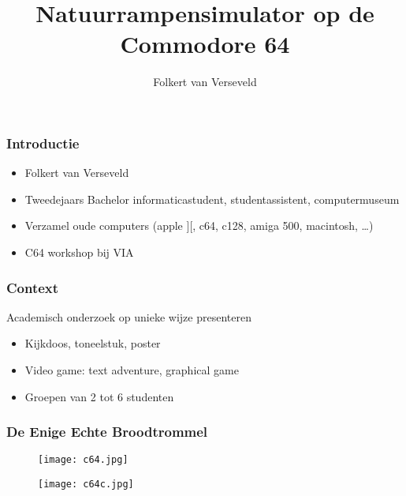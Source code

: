 \documentclass[aspectratio=169]{beamer}
\title{Natuurrampensimulator op de Commodore 64}
\author{Folkert van Verseveld}
\begin{document}
\maketitle



\begin{frame}
\frametitle{Introductie}

\begin{itemize}
\item Folkert van Verseveld
\item Tweedejaars Bachelor informaticastudent, studentassistent, computermuseum
\item Verzamel oude computers (apple ][, c64, c128, amiga 500, macintosh, \dots)
\item C64 workshop bij VIA
\end{itemize}

\end{frame}

\begin{frame}
\frametitle{Context}

Academisch onderzoek op unieke wijze presenteren
\begin{itemize}
\item Kijkdoos, toneelstuk, poster
\item Video game: text adventure, graphical game
\item Groepen van 2 tot 6 studenten
\end{itemize}

\end{frame}

\begin{frame}
\frametitle{De Enige Echte Broodtrommel}

\begin{figure}
\texttt{[image: c64.jpg]}
\end{figure}

\begin{figure}
\texttt{[image: c64c.jpg]}
\end{figure}

\end{frame}
\end{document}
